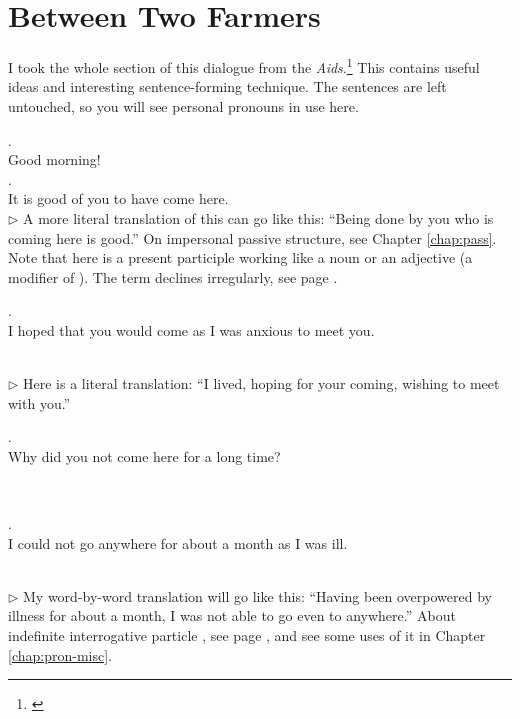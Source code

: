 {}
\section*{Between Two Farmers}

I took the whole section of this dialogue from the \emph{Aids}.\footnote{\citealp[pp.~54--6]{buddhadatta:aids}} This contains useful ideas and interesting sentence-forming technique. The sentences are left untouched, so you will see personal pronouns in use here.

\medskip
{}. \\
\hspace*{12mm}Good morning!\\

\medskip
{}. \\
\hspace*{12mm}It is good of you to have come here.\\
{\small $\triangleright$ A more literal translation of this can go like this: ``Being done by you who is coming here is good.'' On impersonal passive structure, see Chapter \ref{chap:pass}. Note that  here is a present participle working like a noun or an adjective (a modifier of ). The term declines irregularly, see page \pageref{decl:gacchanta}.}

\medskip
\parbox[lt]{0.93\linewidth}{\raggedright{}. \\
\hspace*{6mm}I hoped that you would come as I was anxious to meet you.}\\[1mm]
{\small $\triangleright$ Here is a literal translation: ``I lived, hoping for your coming, wishing to meet with you.''}

\medskip
\parbox[lt]{0.93\linewidth}{\raggedright{}. \\
\hspace*{6mm}Why did you not come here for a long time?}\\

\medskip
\parbox[lt]{0.93\linewidth}{\raggedright{}. \\
\hspace*{6mm}I could not go anywhere for about a month as I was ill.}\\[1mm]
{\small $\triangleright$ My word-by-word translation will go like this: ``Having been overpowered by illness for about a month, I was not able to go even to anywhere.'' About indefinite interrogative particle , see page \pageref{nip:ci}, and see some uses of it in Chapter \ref{chap:pron-misc}.}


